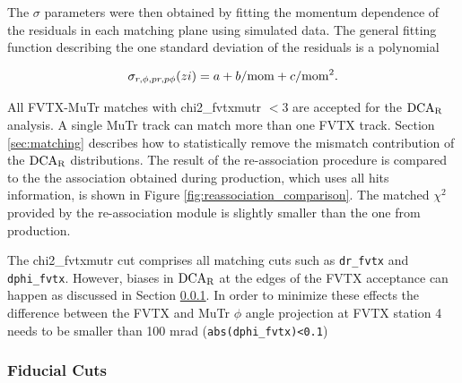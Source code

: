 \documentclass[12pt]{article}
\newcommand{\dcar}{$\rm{DCA}_{R}$ }
\begin{document}
The $\sigma$ parameters were then obtained by fitting the momentum dependence of the residuals in each matching plane using simulated data. The general fitting function describing the 
one standard deviation of the residuals is a polynomial 

\begin{equation}
	\sigma_{r,\phi,pr,p\phi}(zi) = a + b/{\rm mom} + c/{\rm mom}^2.
\end{equation}

All FVTX-MuTr matches with chi2\_fvtxmutr $<$3 are accepted for the \dcar analysis. A single MuTr track can match more than one FVTX track. Section \ref{sec:matching} describes how to 
statistically remove the mismatch contribution of the \dcar distributions. The result of the re-association procedure is compared to the the association obtained during production, which uses 
all hits information, is shown in Figure \ref{fig:reassociation_comparison}. The matched $\chi^2$ provided by the re-association module is slightly smaller than the one from production. 



The chi2\_fvtxmutr cut comprises all matching cuts such as \verb|dr_fvtx| and \verb|dphi_fvtx|. However, biases in \dcar at the edges of the FVTX acceptance can happen as discussed in 
Section \ref{sec:fiducial cuts}. In order to minimize these effects the difference between the FVTX and MuTr $\phi$ angle projection at FVTX station 4 needs to be smaller than 100 mrad 
(\verb|abs(dphi_fvtx)<0.1|)


\subsubsection{Fiducial Cuts}
\label{sec:fiducial cuts}



\end{document}
